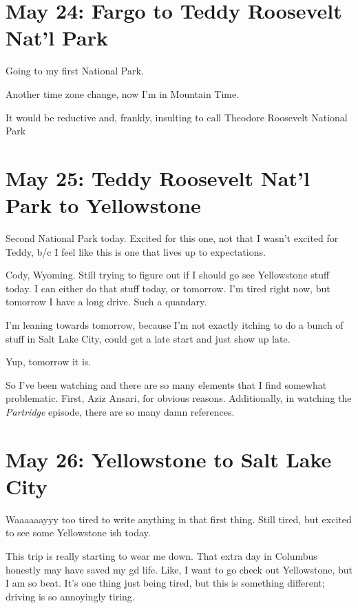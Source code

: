 \documentclass[../butidigress.tex]{subfiles}
\begin{document}
\section{May 24: Fargo to Teddy Roosevelt Nat'l Park}
Going to my first National Park.

\entryskip

Another time zone change, now I'm in Mountain Time.

It would be reductive and, frankly, insulting to call Theodore Roosevelt National Park 

\section{May 25: Teddy Roosevelt Nat'l Park to Yellowstone}
Second National Park today.
Excited for this one, not that I wasn't excited for Teddy, b/c I feel like this is one that lives up to expectations.

\entryskip

Cody, Wyoming.
Still trying to figure out if I should go see Yellowstone stuff today.
I can either do that stuff today, or tomorrow.
I'm tired right now, but tomorrow I have a long drive.
Such a quandary.

I'm leaning towards tomorrow, because I'm not exactly itching to do a bunch of stuff in Salt Lake City, could get a late start and just show up late.

Yup, tomorrow it is.

So I've been watching  and there are so many elements that I find somewhat problematic.
First, Aziz Ansari, for obvious reasons.
Additionally, in watching the \textit{Partridge} episode, there are so many damn  references.

\section{May 26: Yellowstone to Salt Lake City}

\entryskip

Waaaaaayyy too tired to write anything in that first thing.
Still tired, but excited to see some Yellowstone ish today.

This trip is really starting to wear me down.
That extra day in Columbus honestly may have saved my gd life.
Like, I want to go check out Yellowstone, but I am so beat.
It's one thing just being tired, but this is something different; driving is so annoyingly tiring.
\end{document}
